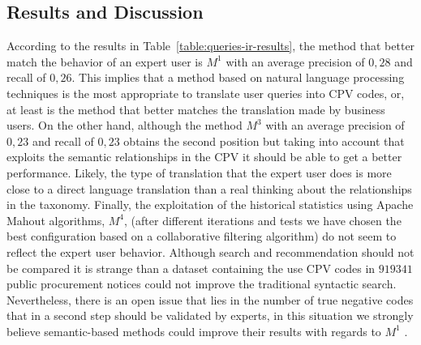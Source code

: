 \subsection{Results and Discussion}
According to the results in Table~\ref{table:queries-ir-results}, the method that better match the behavior 
of an expert user is $M^1$ with an average precision of $0,28$ and recall of $0,26$. This implies that a method based 
on natural language processing techniques is the most appropriate to translate user queries into CPV codes, or, at least 
is the method that better matches the translation made by business users. On the other hand, although the method $M^3$ 
with an average precision of $0,23$ and recall of $0,23$ obtains the second position but taking into account that 
exploits the semantic relationships in the CPV it should be able to get a better performance. Likely, 
the type of translation that the expert user does is more close to a direct language translation than a real thinking about the 
relationships in the taxonomy. Finally, the exploitation of the historical statistics using Apache Mahout algorithms, $M^{4}$, 
(after different iterations and tests we have chosen the best configuration based on a collaborative filtering algorithm) do not 
seem to reflect the expert user behavior. Although search and recommendation should not be compared it is strange 
than a dataset containing the use CPV codes in $919341$ public procurement notices could not improve the traditional syntactic 
search. Nevertheless, there is an open issue that lies in the number of true negative codes that in a second step should 
be validated by experts, in this situation we strongly believe semantic-based methods could improve their results with regards to 
$M^1$ . 

